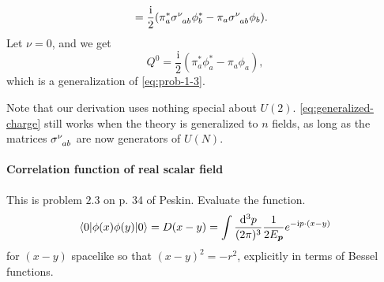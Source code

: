 \documentclass[hyperref, a4paper]{article}
\newcommand*{\ii}{\mathrm{i}}
\begin{document}
\begin{itemize}
\begin{equation}
\begin{aligned}
            &= \frac{\ii}{2} (\pi^*_a \sigma\indices{^\nu_{ab}} \phi^*_b - \pi_a \sigma\indices{^\nu_{ab}} \phi_b).
        \end{aligned}
        \label{eq:generalized-charge}
    \end{equation}
    Let $\nu = 0$, and we get 
    \begin{equation}
        Q^0 = \frac{\ii}{2} (\pi^*_a \phi^*_a - \pi_a \phi_a),
    \end{equation}
    which is a generalization of \eqref{eq:prob-1-3}.

    Note that our derivation uses nothing special about $U(2)$. 
    \eqref{eq:generalized-charge} still works when the theory is generalized to $n$ fields, as long as the matrices $\sigma\indices{^\nu_{ab}}$ are now generators of $U(N)$. 
\end{itemize}

\paragraph{}

\paragraph{Correlation function of real scalar field} This is problem $2.3$ on p. 34 of Peskin. Evaluate the function. 
\[
\langle 0|\phi(x) \phi(y)| 0\rangle=D(x-y)=\int \frac{\dd^{3} p}{(2 \pi)^{3}} \frac{1}{2 E_{\vb*{p}}} e^{-\ii p \cdot (x-y)}
\]
for $(x-y)$ spacelike so that $(x-y)^{2}=-r^{2}$, explicitly in terms of Bessel functions.
\end{document}
